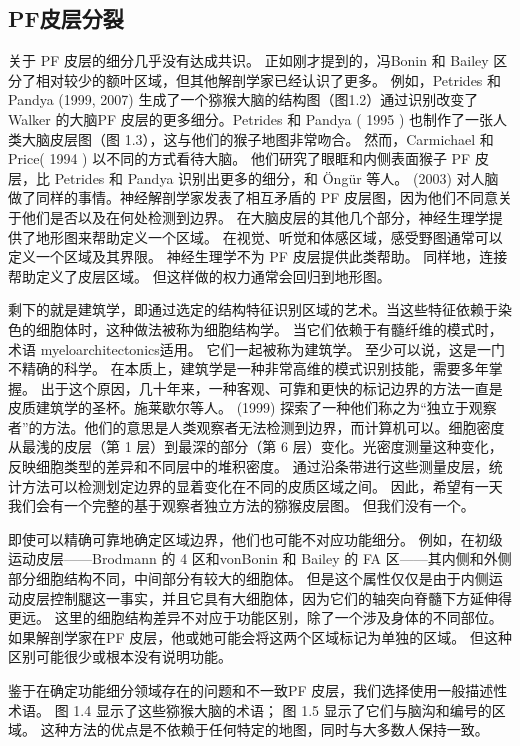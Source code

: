 \subsection{PF皮层分裂}
关于 PF 皮层的细分几乎没有达成共识。 正如刚才提到的，冯Bonin 和 Bailey 区分了相对较少的额叶区域，但其他解剖学家已经认识了更多。 例如，Petrides 和 Pandya (1999, 2007) 生成了一个猕猴大脑的结构图（图1.2）通过识别改变了 Walker 的大脑PF 皮层的更多细分。Petrides 和 Pandya ( 1995 ) 也制作了一张人类大脑皮层图（图 1.3），这与他们的猴子地图非常吻合。 然而，Carmichael 和 Price( 1994 ) 以不同的方式看待大脑。 他们研究了眼眶和内侧表面猴子 PF 皮层，比 Petrides 和 Pandya 识别出更多的细分，和 Öngür 等人。 (2003) 对人脑做了同样的事情。神经解剖学家发表了相互矛盾的 PF 皮层图，因为他们不同意关于他们是否以及在何处检测到边界。 在大脑皮层的其他几个部分，神经生理学提供了地形图来帮助定义一个区域。 在视觉、听觉和体感区域，感受野图通常可以定义一个区域及其界限。 神经生理学不为 PF 皮层提供此类帮助。 同样地，连接帮助定义了皮层区域。 但这样做的权力通常会回归到地形图。
\par
剩下的就是建筑学，即通过选定的结构特征识别区域的艺术。当这些特征依赖于染色的细胞体时，这种做法被称为细胞结构学。 当它们依赖于有髓纤维的模式时，术语 myeloarchitectonics适用。 它们一起被称为建筑学。 至少可以说，这是一门不精确的科学。 在本质上，建筑学是一种非常高维的模式识别技能，需要多年掌握。 出于这个原因，几十年来，一种客观、可靠和更快的标记边界的方法一直是皮质建筑学的圣杯。施莱歇尔等人。 (1999) 探索了一种他们称之为“独立于观察者”的方法。他们的意思是人类观察者无法检测到边界，而计算机可以。细胞密度从最浅的皮层（第 1 层）到最深的部分（第 6 层）变化。光密度测量这种变化，反映细胞类型的差异和不同层中的堆积密度。 通过沿条带进行这些测量皮层，统计方法可以检测划定边界的显着变化在不同的皮质区域之间。 因此，希望有一天我们会有一个完整的基于观察者独立方法的猕猴皮层图。 但我们没有一个。
\par
即使可以精确可靠地确定区域边界，他们也可能不对应功能细分。 例如，在初级运动皮层——Brodmann 的 4 区和vonBonin 和 Bailey 的 FA 区——其内侧和外侧部分细胞结构不同，中间部分有较大的细胞体。 但是这个属性仅仅是由于内侧运动皮层控制腿这一事实，并且它具有大细胞体，因为它们的轴突向脊髓下方延伸得更远。 这里的细胞结构差异不对应于功能区别，除了一个涉及身体的不同部位。 如果解剖学家在PF 皮层，他或她可能会将这两个区域标记为单独的区域。 但这种区别可能很少或根本没有说明功能。
\par
鉴于在确定功能细分领域存在的问题和不一致PF 皮层，我们选择使用一般描述性术语。 图 1.4 显示了这些猕猴大脑的术语； 图 1.5 显示了它们与脑沟和编号的区域。 这种方法的优点是不依赖于任何特定的地图，同时与大多数人保持一致。
